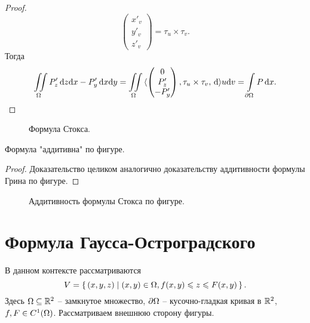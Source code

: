 \begin{proof}
\[\begin{pmatrix}
            x'_v \\ y'_v \\ z'_v
        \end{pmatrix} = \tau_u \times \tau_v
    .\]
    Тогда
    \[
        \iint\limits_\Omega{P'_z \,\mathrm{d}z \mathrm{d}x - P'_y \,\mathrm{d}x \mathrm{d}y} = \iint\limits_\Omega{\langle 
        \begin{pmatrix}
            0 \\ P'_z \\ -P'_y
        \end{pmatrix}, \tau_u \times \tau_v, \,\mathrm{d}\rangle u \mathrm{d}v} =
        \int\limits_{\partial \Omega}{P \,\mathrm{d} x}
    .\]
\end{proof}

\begin{figure}[!ht]
    \centering
    \caption{Формула Стокса.}
\end{figure}

\begin{remark}
    Формула "аддитивна" по фигуре.
\end{remark}
\begin{proof}
    Доказательство целиком аналогично доказательству аддитивности формулы Грина по фигуре.
\end{proof}

\begin{figure}[h!]
    \centering
    \caption{Аддитивность формулы Стокса по фигуре.}
\end{figure}

\newpage

\section{Формула Гаусса-Остроградского}

\begin{remark}
    В данном контексте рассматриваются
\[
    V = \left\{\, (x, y, z) \mid (x, y) \in \Omega, f(x, y) \leqslant z \leqslant F(x, y) \,\right\}
.\] 
    Здесь $\Omega \subseteq \mathbb{R}^2$ -- замкнутое множество, $\partial \Omega$ -- кусочно-гладкая кривая
    в $\mathbb{R}^2$, $f, F \in C^1(\Omega)$. Рассматриваем внешнюю сторону фигуры.
\end{remark}

